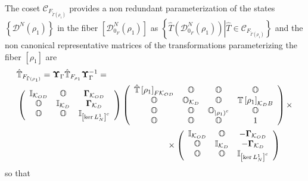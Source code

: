 \documentclass[aps,preprint]{revtex4}%
\begin{document}
The coset $\mathcal{C}_{F_{\tilde{\Gamma}\left(  \rho_{1}\right)  }}$ provides
a non redundant parameterization of the states $\left\{  \mathcal{D}%
^{N}\left(  \rho_{1}\right)  \right\}  $ in the fiber $\left[  \mathcal{D}%
_{0_{F}}^{N}\left(  \rho_{1}\right)  \right]  $ as $\left\{  \left.  \hat
{T}\left(  \mathcal{D}_{0_{F}}^{N}\left(  \rho_{1}\right)  \right)
\right\vert \hat{T}\in\mathcal{C}_{F_{\tilde{\Gamma}\left(  \rho_{1}\right)
}}\right\}  $ and the non canonical representative matrices of the
transformations parameterizing the fiber $\left[  \mathfrak{\rho}_{1}\right]
$ are
\begin{align}
&  \mathbb{\hat{T}}_{F_{\tilde{\Gamma}\left(  \rho_{1}\right)  }%
}=\mathbf{\Upsilon}_{\Gamma}\mathbb{\hat{T}}_{F_{\rho_{1}}}\mathbf{\Upsilon
}_{\Gamma}^{-1}=\nonumber\\
&  \left(
\begin{array}
[c]{ccc}%
\mathbb{I}_{\mathcal{K}_{OD}} & \mathbb{O} & \mathbf{\Gamma}_{\mathcal{K}%
_{OD}}\\
\mathbb{O} & \mathbb{I}_{\mathcal{K}_{D}} & \mathbf{\Gamma}_{\mathcal{K}_{D}%
}\\
\mathbb{O} & \mathbb{O} & \mathbb{I}_{\left[  \ker L_{N}^{1}\right]  ^{c}}%
\end{array}
\right)  \left(
\begin{array}
[c]{cccc}%
\mathbb{\hat{T}}\left[  \rho_{1}\right]  _{F\mathcal{K}_{OD}} & \mathbb{O} &
\mathbb{O} & \mathbb{O}\\
\mathbb{O} & \mathbb{O}_{\mathcal{K}_{D}} & \mathbb{O} & \mathbb{T}\left[
\rho_{1}\right]  _{\mathcal{K}_{D}B}\\
\mathbb{O} & \mathbb{O} & \mathbb{O}_{\left\vert \mathfrak{\rho}_{1}\right)
^{c}} & \mathbb{O}\\
\mathbb{O} & \mathbb{O} & \mathbb{O} & 1
\end{array}
\right)  \times\\
&  \qquad\qquad\qquad\qquad\qquad\qquad\qquad\qquad\qquad\times\left(
\begin{array}
[c]{ccc}%
\mathbb{I}_{\mathcal{K}_{OD}} & \mathbb{O} & -\mathbf{\Gamma}_{\mathcal{K}%
_{OD}}\\
\mathbb{O} & \mathbb{I}_{\mathcal{K}_{D}} & -\mathbf{\Gamma}_{\mathcal{K}_{D}%
}\\
\mathbb{O} & \mathbb{O} & \mathbb{I}_{\left[  \ker L_{N}^{1}\right]  ^{c}}%
\end{array}
\right)
\end{align}
so that
\end{document}
